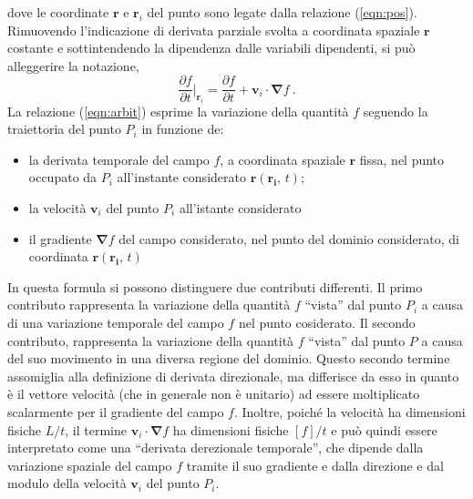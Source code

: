 dove le coordinate $\bm{r}$ e $\bm{r}_i$ del punto sono legate dalla relazione (\ref{eqn:pos}). Rimuovendo l'indicazione di derivata parziale svolta a coordinata spaziale $\bm{r}$ costante e sottintendendo la dipendenza dalle variabili dipendenti, si può alleggerire la notazione,
\begin{equation}\label{eqn:arbit}
      \frac{\partial f}{\partial t}\bigg|_{\bm{r}_i} = \frac{\partial f}{\partial t} + \bm{v}_i \cdot \bm{\nabla} f \ .
\end{equation}
La relazione (\ref{eqn:arbit}) esprime la variazione della quantità $f$ seguendo la traiettoria del punto $P_i$ in funzione de:
\begin{itemize}
    \item la derivata temporale del campo $f$, a coordinata spaziale $\bm{r}$ fissa, nel punto occupato da $P_i$ all'instante considerato $\bm{r}(\bm{r_i}, \, t)$;
    \item la velocità $\bm{v}_i$ del punto $P_i$ all'istante considerato
    \item il gradiente $\bm{\nabla} f$ del campo considerato, nel punto del dominio considerato, di coordinata $\bm{r}(\bm{r_i}, \, t)$
\end{itemize}
In questa formula si possono distinguere due contributi differenti. Il primo contributo rappresenta la variazione della quantità $f$ ``vista'' dal punto $P_i$ a causa di una variazione temporale del campo $f$ nel punto cosiderato. Il secondo contributo, rappresenta la variazione della quantità $f$ ``vista'' dal punto $P$ a causa del suo movimento in una diversa regione del dominio. Questo secondo termine assomiglia alla definizione di derivata direzionale, ma differisce da esso in quanto è il vettore velocità (che in generale non è unitario) ad essere moltiplicato scalarmente per il gradiente del campo $f$. Inoltre, poiché la velocità ha dimensioni fisiche $L/t$, il termine $\bm{v}_i \cdot \bm{\nabla} f$ ha dimensioni fisiche $[f]/t$ e può quindi essere interpretato come una ``derivata derezionale temporale'', che dipende dalla variazione spaziale del campo $f$ tramite il suo gradiente e dalla direzione e dal modulo della velocità $\bm{v}_i$ del punto $P_i$.

